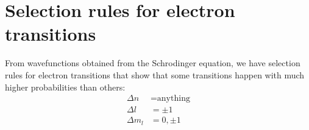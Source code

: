 \section{Selection rules for electron transitions}
From wavefunctions obtained from the Schrodinger equation, we have selection rules for electron transitions that show that some transitions happen with much higher probabilities than others: \begin{align*}
    \Delta n &= \text{anything}\\
    \Delta l &= \pm 1\\
    \Delta m_l &= 0, \pm 1\\
\end{align*}